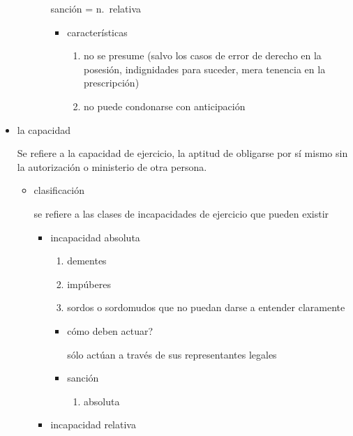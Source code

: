 \documentclass[]{article}
\providecommand{\tightlist}{%
  \setlength{\itemsep}{0pt}\setlength{\parskip}{0pt}}
\begin{document}
\begin{itemize}
\begin{itemize}
\begin{itemize}
      sanción = n.~relativa

      \begin{itemize}
      \tightlist
      \item
        características

        \begin{enumerate}
        \def\labelenumi{\arabic{enumi}.}
        \tightlist
        \item
          no se presume (salvo los casos de error de derecho en la
          posesión, indignidades para suceder, mera tenencia en la
          prescripción)
        \item
          no puede condonarse con anticipación
        \end{enumerate}
      \end{itemize}
    \end{itemize}
  \end{itemize}
\item
  la capacidad

  Se refiere a la capacidad de ejercicio, la aptitud de obligarse por sí
  mismo sin la autorización o ministerio de otra persona.

  \begin{itemize}
  \item
    clasificación

    se refiere a las clases de incapacidades de ejercicio que pueden
    existir

    \begin{itemize}
    \item
      incapacidad absoluta

      \begin{enumerate}
      \def\labelenumi{\arabic{enumi}.}
      \tightlist
      \item
        dementes
      \item
        impúberes
      \item
        sordos o sordomudos que no puedan darse a entender claramente
      \end{enumerate}

      \begin{itemize}
      \item
        cómo deben actuar?

        sólo actúan a través de sus representantes legales
      \item
        sanción

        \begin{enumerate}
        \def\labelenumi{\alph{enumi}.}
        \setcounter{enumi}{13}
        \tightlist
        \item
          absoluta
        \end{enumerate}
      \end{itemize}
    \item
      incapacidad relativa


\end{itemize}
\end{itemize}
\end{itemize}
\end{document}
